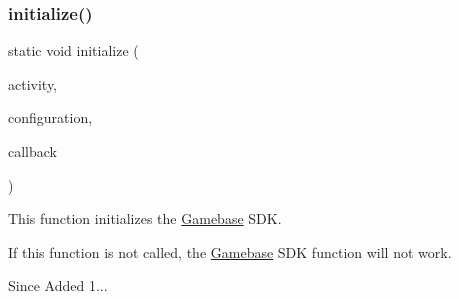 \subsubsection{\texorpdfstring{initialize()}{initialize()}}
{\footnotesize\ttfamily static void initialize (\begin{DoxyParamCaption}\item[{final Activity}]{activity,  }\item[{final \hyperlink{classcom_1_1toast_1_1android_1_1gamebase_1_1_gamebase_configuration}{Gamebase\+Configuration}}]{configuration,  }\item[{@Nullable final \hyperlink{interfacecom_1_1toast_1_1android_1_1gamebase_1_1_gamebase_data_callback}{Gamebase\+Data\+Callback}$<$ \hyperlink{classcom_1_1toast_1_1android_1_1gamebase_1_1launching_1_1data_1_1_launching_info}{Launching\+Info} $>$}]{callback }\end{DoxyParamCaption})\hspace{0.3cm}{\ttfamily [static]}}



This function initializes the \hyperlink{classcom_1_1toast_1_1android_1_1gamebase_1_1_gamebase}{Gamebase} S\+DK. 

If this function is not called, the \hyperlink{classcom_1_1toast_1_1android_1_1gamebase_1_1_gamebase}{Gamebase} S\+DK function will not work.

\begin{DoxySince}{Since}
Added 1... 
\end{DoxySince}

